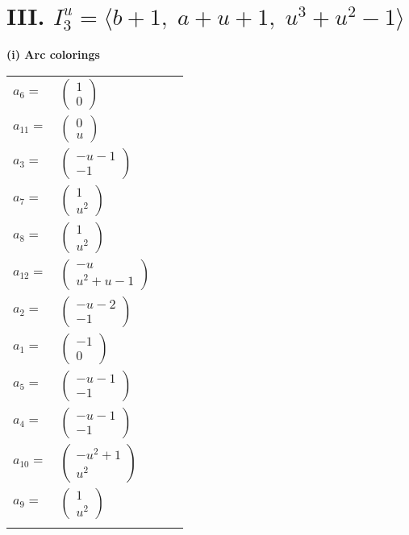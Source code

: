 \documentclass[1p]{elsarticle_modified}
\theoremstyle{definition}
\begin{document}
\centering \section*{III. $I^u_{3}= \langle b+1,\;a+u+1,\;u^3+u^2-1 \rangle$}
\flushleft \textbf{(i) Arc colorings}\\
\begin{tabular}{m{7pt} m{180pt} m{7pt} m{180pt} }
\flushright $a_{6}=$&$\begin{pmatrix}1\\0\end{pmatrix}$ \\
\flushright $a_{11}=$&$\begin{pmatrix}0\\u\end{pmatrix}$ \\
\flushright $a_{3}=$&$\begin{pmatrix}- u-1\\-1\end{pmatrix}$ \\
\flushright $a_{7}=$&$\begin{pmatrix}1\\u^2\end{pmatrix}$ \\
\flushright $a_{8}=$&$\begin{pmatrix}1\\u^2\end{pmatrix}$ \\
\flushright $a_{12}=$&$\begin{pmatrix}- u\\u^2+u-1\end{pmatrix}$ \\
\flushright $a_{2}=$&$\begin{pmatrix}- u-2\\-1\end{pmatrix}$ \\
\flushright $a_{1}=$&$\begin{pmatrix}-1\\0\end{pmatrix}$ \\
\flushright $a_{5}=$&$\begin{pmatrix}- u-1\\-1\end{pmatrix}$ \\
\flushright $a_{4}=$&$\begin{pmatrix}- u-1\\-1\end{pmatrix}$ \\
\flushright $a_{10}=$&$\begin{pmatrix}- u^2+1\\u^2\end{pmatrix}$ \\
\flushright $a_{9}=$&$\begin{pmatrix}1\\u^2\end{pmatrix}$\\&\end{tabular}
\end{document}
